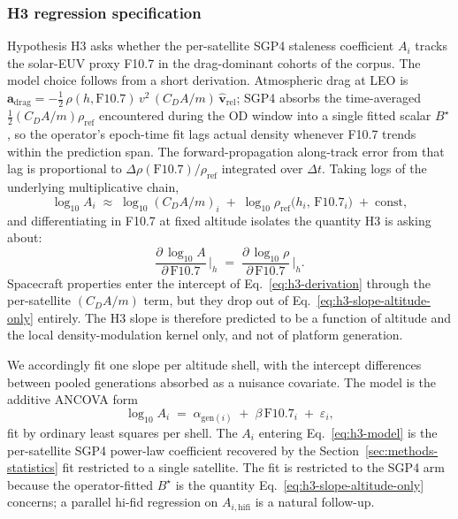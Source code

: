 \documentclass[10pt, letterpaper]{article}
\begin{document}
\subsubsection{H3 regression specification}
\label{sec:methods-h3-regression}

Hypothesis H3 asks whether the per-satellite SGP4 staleness
coefficient $A_{i}$ tracks the solar-EUV proxy F10.7 in the
drag-dominant cohorts of the corpus. The model choice follows
from a short derivation. Atmospheric drag at LEO is
$\mathbf{a}_{\mathrm{drag}} = -\tfrac{1}{2}\,\rho(h,
\mathrm{F}10.7)\,v^{2}\,(C_{D} A / m)\,\hat{\mathbf{v}}_{\mathrm{rel}}$;
SGP4 absorbs the time-averaged $\tfrac{1}{2}(C_{D} A / m)\rho_{\mathrm{ref}}$
encountered during the OD window into a single fitted scalar
$B^{\!\star}$, so the operator's epoch-time fit lags actual
density whenever F10.7 trends within the prediction span. The
forward-propagation along-track error from that lag is
proportional to $\Delta\rho(\mathrm{F}10.7)/\rho_{\mathrm{ref}}$
integrated over $\Delta t$. Taking logs of the underlying
multiplicative chain,
\begin{equation}
  \label{eq:h3-derivation}
  \log_{10} A_{i}
  \;\approx\;
  \log_{10}(C_{D} A / m)_{i}
  \;+\;
  \log_{10}\rho_{\mathrm{ref}}\!\bigl(h_{i},\,\mathrm{F}10.7_{i}\bigr)
  \;+\;
  \mathrm{const},
\end{equation}
and differentiating in F10.7 at fixed altitude isolates the
quantity H3 is asking about:
\begin{equation}
  \label{eq:h3-slope-altitude-only}
  \frac{\partial\,\log_{10} A}{\partial\,\mathrm{F}10.7}
  \,\Big|_{h}
  \;=\;
  \frac{\partial\,\log_{10}\rho}{\partial\,\mathrm{F}10.7}
  \,\Big|_{h}.
\end{equation}
Spacecraft properties enter the intercept of
Eq.~\eqref{eq:h3-derivation} through the per-satellite
$(C_{D} A / m)$ term, but they drop out of
Eq.~\eqref{eq:h3-slope-altitude-only} entirely. The H3 slope is
therefore predicted to be a function of altitude and the local
density-modulation kernel only, and not of platform generation.

We accordingly fit one slope per altitude shell, with the
intercept differences between pooled generations absorbed as a
nuisance covariate. The model is the additive ANCOVA form
\begin{equation}
  \label{eq:h3-model}
  \log_{10} A_{i}
  \;=\;
  \alpha_{\mathrm{gen}(i)}
  \;+\;
  \beta\,\mathrm{F}10.7_{i}
  \;+\;
  \varepsilon_{i},
\end{equation}
fit by ordinary least squares per shell. The
$A_{i}$ entering Eq.~\eqref{eq:h3-model} is the per-satellite
SGP4 power-law coefficient recovered by the
Section~\ref{sec:methods-statistics} fit restricted to a single
satellite. The fit is restricted to the SGP4 arm because the
operator-fitted $B^{\!\star}$ is the quantity
Eq.~\eqref{eq:h3-slope-altitude-only} concerns; a parallel hi-fid
regression on $A_{i,\mathrm{hifi}}$ is a natural follow-up.
\end{document}

